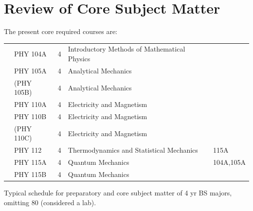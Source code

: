 \documentclass[12pt]{article}
\begin{document}
\section{Review of Core Subject Matter}

The present core required courses are:\\
\begin{tabular}{lllll}
& PHY 104A & 4 & Introductory Methods of Mathematical Physics \\
& PHY 105A & 4 & Analytical Mechanics\\
& (PHY 105B) & 4 & Analytical Mechanics\\
& PHY 110A & 4 & Electricity and Magnetism \\
& PHY 110B & 4 & Electricity and Magnetism  \\
& (PHY 110C) & 4 & Electricity and Magnetism  \\
& PHY 112   & 4 & Thermodynamics and Statistical Mechanics & 115A\\
& PHY 115A & 4 & Quantum Mechanics & 104A,105A\\
& PHY 115B & 4 & Quantum Mechanics & \\
\end{tabular}

Typical schedule for preparatory and core subject matter of 4 yr BS majors, omitting 80 (considered a lab).
\end{document}

